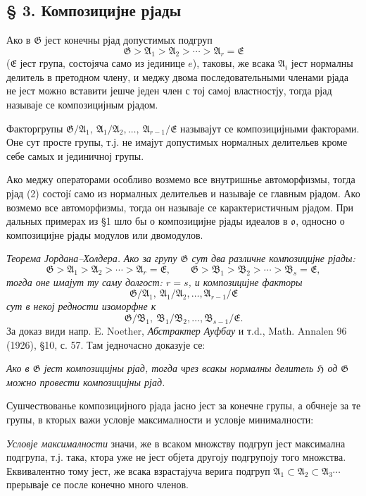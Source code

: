 ﻿\documentclass[11pt]{article}
\providecommand{\mG}{\mathfrak{G}}
\providecommand{\mA}{\mathfrak{A}}
\providecommand{\mB}{\mathfrak{B}}
\providecommand{\mE}{\mathfrak{E}}
\providecommand{\mH}{\mathfrak{H}}
\providecommand{\mo}{\mathfrak{o}}
\begin{document}
\setcounter{footnote}{10}

\subsection*{§ 3. Композицијне рјады}

Ако в $\mG$ јест конечны рјад допустимых подгруп
\[
        \mG>\mA_1>\mA_2>\cdots>\mA_r=\mE \tag{2}
\]
($\mE$ јест група, состојяча само из јединице $e$), таковы, же всака $\mA_i$ јест нормалны делитель в претодном члену, и меджу двома последовательными членами рјада не јест можно вставити јешче једен член с тој самој властностју, тогда рјад называје се композицијным рјадом.

Факторгрупы $\mG/\mA_1,\ \mA_1/\mA_2,\ldots,\ \mA_{r-1}/\mE$ называјут се композицијными факторами. Оне сут просте групы, т.ј. не имајут допустимых нормалных делительев кроме себе самых и јединичној групы.

Ако меджу операторами особливо возмемо все внутришнье автоморфизмы, тогда рјад (2) состојí само из нормалных делительев и называје се главным рјадом. Ако возмемо все автоморфизмы, тогда он называје се карактеристичным рјадом. При дальных примерах из §1 шло бы о композицијне рјады идеалов в $\mo$, односно о композицијне рјады модулов или двомодулов.

\emph{Теорема Јордана--Холдера.} \emph{Ако за групу $\mG$ сут два различне композицијне рјады:}
\[
        \mG>\mA_1>\mA_2>\cdots>\mA_r=\mE,
        \qquad
        \mG>\mB_1>\mB_2>\cdots>\mB_s=\mE,
\]
\emph{тогда оне имајут ту саму долгост: $r=s$, и композицијне факторы}
\[
        \mG/\mA_1,\ \mA_1/\mA_2,\ldots,\mA_{r-1}/\mE
\]
\emph{сут в некој редности изоморфне к}
\[
        \mG/\mB_1,\ \mB_1/\mB_2,\ldots,\mB_{s-1}/\mE.
\]
За доказ види напр. E. Noether, \emph{Абстрактер Ауфбау} и т.d., Math. Annalen 96 (1926), §10, с. 57. Там једночасно доказује се:

\emph{Ако в $\mG$ јест композицијны рјад, тогда чрез всакы нормалны делитель $\mH$ од $\mG$ можно провести композицијны рјад.}

Сушчествованье композицијного рјада јасно јест за конечне групы, а обчнеје за те групы, в кторых важи условје максималности и условје минималности:

\emph{Условје максималности} значи, же в всаком множству подгруп јест максимална подгрупа, т.ј. така, ктора уже не јест објета другоју подгрупоју того множства. Еквивалентно тому јест, же всака взрастајуча верига подгруп $\mA_1\subset\mA_2\subset\mA_3\cdots$ прерываје се после конечно много членов.
\end{document}
